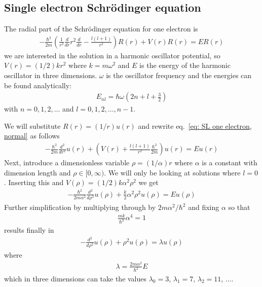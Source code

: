 \documentclass[11pt, a4paper]{article}
\newcommand{\SL}{Schr\"{o}dinger }
\begin{document}
		
		\subsection{Single electron \SL equation}
			The radial part of the \SL equation for one electron is
			\begin{align}
			-\frac{\hbar^2}{2m} \left( \frac{1}{r^2} \frac{d}{dr} r^2 \frac{d}{dr}-\frac{l(l + 1)}{r^2} \right) R(r) + V(r)R(r) = ER(r) \label{eq: SL one electron, normal}
			\end{align}
			we are interested in the solution in a harmonic oscillator potential, so $V(r) = (1/2)kr^2$ where $k=m\omega^2$ and $E$ is the energy of the harmonic oscillator in three dimensions. $\omega$ is the oscillator frequency and the energies can be found analytically:
			\begin{align*}
				E_{nl} = \hbar \omega \left( 2n+l+\frac{3}{2} \right) 
			\end{align*}
			with $n=0, 1, 2, ...$ and $l = 0, 1, 2, ..., n-1$. 
			
			We will substitute $R(r) = (1/r)u(r)$ and rewrite eq.~\eqref{eq: SL one electron, normal} as follows
			\begin{align*}
				-\frac{\hbar^2}{2m} \frac{d^2}{dr^2}u(r) + \left( V(r) + \frac{l(l+1)}{r^2}\frac{\hbar^2}{2m} \right) u(r) = Eu(r)
			\end{align*}
			Next, introduce a dimensionless variable $\rho = (1/\alpha)r$ where $\alpha$ is a constant with dimension length and $\rho \in [0, \infty)$. We will only be looking at solutions where $l=0$. Inserting this and $V(\rho)=(1/2)k\alpha^2\rho^2$ we get 
			\begin{align}
				-\frac{\hbar^2}{2m\alpha^2}\frac{d^2}{d\rho^2}u(\rho) + \frac{k}{2}\alpha^2\rho^2u(\rho) = Eu(\rho) \label{eq: SL one electron halfway there}
			\end{align}
			Further simplification by multiplying through by $2m\alpha^2/\hbar^2$ and fixing $\alpha$ so that
			\begin{align*}
				\frac{mk}{\hbar^2}\alpha^4 = 1
			\end{align*}
			results finally in
			\begin{align}
				-\frac{d^2}{d\rho^2}u(\rho) + \rho^2u(\rho) = \lambda u(\rho) \label{eq: SL one electron, simple}
			\end{align}
			where 
			\begin{align*}
				\lambda = \frac{2m\alpha^2}{\hbar^2}E
			\end{align*}
			which in three dimensions can take the values $\lambda_0 = 3$, $\lambda_1 = 7$, $\lambda_2 = 11$, ....
			
\end{document}
